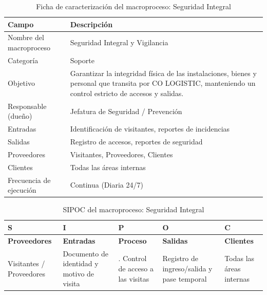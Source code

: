 \documentclass[11pt, a4paper, oneside]{report}
\begin{document}
\begin{table}[H]
\centering\small
\renewcommand{\arraystretch}{1.35}
\setlength{\tabcolsep}{6pt}
\begin{tabularx}{\textwidth}{|>{\raggedright\arraybackslash}p{}|>{\raggedright\arraybackslash}X|}
\hline
\rowcolor{upeu_dark}
\color{white}\bfseries Campo & \color{white}\bfseries Descripción \\ \hline
\rowcolor{gray!10}
Nombre del macroproceso & Seguridad Integral y Vigilancia \\ \hline
Categoría & Soporte \\ \hline
\rowcolor{gray!10}
Objetivo & Garantizar la integridad física de las instalaciones, bienes y personal que transita por CO LOGISTIC, manteniendo un control estricto de accesos y salidas. \\ \hline
Responsable (dueño) & Jefatura de Seguridad / Prevención \\ \hline
\rowcolor{gray!10}
Entradas & Identificación de visitantes, reportes de incidencias \\ \hline
Salidas & Registro de accesos, reportes de seguridad \\ \hline
\rowcolor{gray!10}
Proveedores & Visitantes, Proveedores, Clientes \\ \hline
Clientes & Todas las áreas internas \\ \hline
\rowcolor{gray!10}
Frecuencia de ejecución & Continua (Diaria 24/7) \\ \hline
\end{tabularx}
\caption{Ficha de caracterización del macroproceso: Seguridad Integral}
\end{table}

\begin{table}[H]
\centering\small
\renewcommand{\arraystretch}{1.3}
\setlength{\tabcolsep}{4pt}
\begin{tabularx}{\textwidth}{|>{\raggedright\arraybackslash}p{}|>{\raggedright\arraybackslash}p{}|>{\raggedright\arraybackslash}p{}|>{\raggedright\arraybackslash}p{}|>{\raggedright\arraybackslash}X|}
\hline
\rowcolor{upeu_dark}
\color{white}\bfseries S & \color{white}\bfseries I & \color{white}\bfseries P & \color{white}\bfseries O & \color{white}\bfseries C \\ \hline
\rowcolor{upeu_light}
\bfseries Proveedores & \bfseries Entradas & \bfseries Proceso & \bfseries Salidas & \bfseries Clientes \\ \hline
Visitantes / Proveedores &
Documento de identidad y motivo de visita &
1. Control de acceso a las visitas &
Registro de ingreso/salida y pase temporal &
Todas las áreas internas \\ \hline
\end{tabularx}
\caption{SIPOC del macroproceso: Seguridad Integral}
\end{table}
\end{document}
